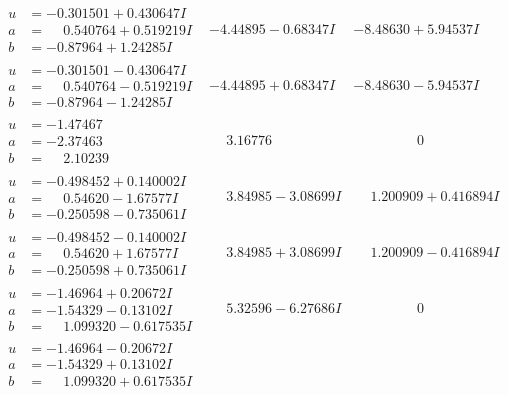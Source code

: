 \documentclass[1p]{elsarticle_modified}
\theoremstyle{definition}
\begin{document}
$$\begin{array}{c|c|c}
\begin{aligned}
u &= -0.301501 + 0.430647 I \\
a &= \phantom{-}0.540764 + 0.519219 I \\
b &= -0.87964 + 1.24285 I\end{aligned}
 & -4.44895 - 0.68347 I & -8.48630 + 5.94537 I \\ \hline\begin{aligned}
u &= -0.301501 - 0.430647 I \\
a &= \phantom{-}0.540764 - 0.519219 I \\
b &= -0.87964 - 1.24285 I\end{aligned}
 & -4.44895 + 0.68347 I & -8.48630 - 5.94537 I \\ \hline\begin{aligned}
u &= -1.47467\phantom{ +0.000000I} \\
a &= -2.37463\phantom{ +0.000000I} \\
b &= \phantom{-}2.10239\phantom{ +0.000000I}\end{aligned}
 & \phantom{-}3.16776\phantom{ +0.000000I} & \phantom{-0.000000 } 0 \\ \hline\begin{aligned}
u &= -0.498452 + 0.140002 I \\
a &= \phantom{-}0.54620 - 1.67577 I \\
b &= -0.250598 - 0.735061 I\end{aligned}
 & \phantom{-}3.84985 - 3.08699 I & \phantom{-}1.200909 + 0.416894 I \\ \hline\begin{aligned}
u &= -0.498452 - 0.140002 I \\
a &= \phantom{-}0.54620 + 1.67577 I \\
b &= -0.250598 + 0.735061 I\end{aligned}
 & \phantom{-}3.84985 + 3.08699 I & \phantom{-}1.200909 - 0.416894 I \\ \hline\begin{aligned}
u &= -1.46964 + 0.20672 I \\
a &= -1.54329 - 0.13102 I \\
b &= \phantom{-}1.099320 - 0.617535 I\end{aligned}
 & \phantom{-}5.32596 - 6.27686 I & \phantom{-0.000000 } 0 \\ \hline\begin{aligned}
u &= -1.46964 - 0.20672 I \\
a &= -1.54329 + 0.13102 I \\
b &= \phantom{-}1.099320 + 0.617535 I\end{aligned}

\end{array}$$
\end{document}
